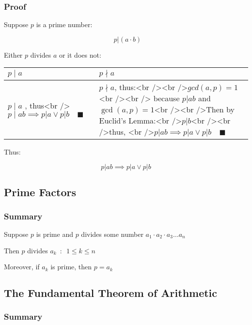 \documentclass[
]{article}
\begin{document}
\hypertarget{header-n207}{%
\subsubsection{Proof}\label{header-n207}}

Suppose \(p\) is a prime number:

\[\enspace p | (a \cdot b)\]

Either \(p\) divides \(a\) or it does not:

\begin{longtable}[]{@{}ll@{}}
\toprule
\(p\mid a\) & \(p\nmid a\)\tabularnewline
\midrule
\endhead
\(p\mid a\) , thus\textless br
/\textgreater{}\(p\mid ab \implies p|a \vee p|b \quad \blacksquare\) &
\(p \nmid a\), thus:\textless br /\textgreater{}\textless br
/\textgreater{}\(gcd(a,p) = 1\) \textless br /\textgreater{}\textless br
/\textgreater{} because \(p|ab\) and \(\gcd(a,p) = 1\)\textless br
/\textgreater{}\textless br /\textgreater{}Then by Euclid's
Lemma:\textless br /\textgreater{}\(p|b\)\textless br
/\textgreater{}\textless br /\textgreater{}thus, \textless br
/\textgreater{}\(p|ab \implies p|a \vee p|b \quad \blacksquare\)\tabularnewline
\bottomrule
\end{longtable}

Thus:

\[p|ab \implies p|a \vee p|b\]

\hypertarget{header-n220}{%
\subsection{Prime Factors}\label{header-n220}}

\hypertarget{header-n221}{%
\subsubsection{Summary}\label{header-n221}}

Suppose \(p\) is prime and \(p\) divides some number
\(a_1 \cdot a_2 \cdot a_3 \dots a_n\)

Then \(p\) divides \(a_k \enspace : \enspace 1 \leq k \leq n\)

Moreover, if \(a_k\) is prime, then \(p=a_k\)

\hypertarget{header-n225}{%
\subsection{The Fundamental Theorem of Arithmetic}\label{header-n225}}

\hypertarget{header-n226}{%
\subsubsection{Summary}\label{header-n226}}
\end{document}
